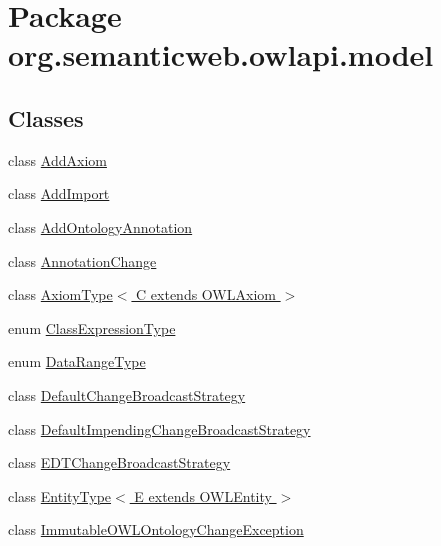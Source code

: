 \hypertarget{namespaceorg_1_1semanticweb_1_1owlapi_1_1model}{\section{Package org.\-semanticweb.\-owlapi.\-model}
\label{namespaceorg_1_1semanticweb_1_1owlapi_1_1model}
}
\subsection*{Classes}
\begin{DoxyCompactItemize}
\item 
class \hyperlink{classorg_1_1semanticweb_1_1owlapi_1_1model_1_1_add_axiom}{Add\-Axiom}
\item 
class \hyperlink{classorg_1_1semanticweb_1_1owlapi_1_1model_1_1_add_import}{Add\-Import}
\item 
class \hyperlink{classorg_1_1semanticweb_1_1owlapi_1_1model_1_1_add_ontology_annotation}{Add\-Ontology\-Annotation}
\item 
class \hyperlink{classorg_1_1semanticweb_1_1owlapi_1_1model_1_1_annotation_change}{Annotation\-Change}
\item 
class \hyperlink{classorg_1_1semanticweb_1_1owlapi_1_1model_1_1_axiom_type_3_01_c_01extends_01_o_w_l_axiom_01_4}{Axiom\-Type$<$ C extends O\-W\-L\-Axiom $>$}
\item 
enum \hyperlink{enumorg_1_1semanticweb_1_1owlapi_1_1model_1_1_class_expression_type}{Class\-Expression\-Type}
\item 
enum \hyperlink{enumorg_1_1semanticweb_1_1owlapi_1_1model_1_1_data_range_type}{Data\-Range\-Type}
\item 
class \hyperlink{classorg_1_1semanticweb_1_1owlapi_1_1model_1_1_default_change_broadcast_strategy}{Default\-Change\-Broadcast\-Strategy}
\item 
class \hyperlink{classorg_1_1semanticweb_1_1owlapi_1_1model_1_1_default_impending_change_broadcast_strategy}{Default\-Impending\-Change\-Broadcast\-Strategy}
\item 
class \hyperlink{classorg_1_1semanticweb_1_1owlapi_1_1model_1_1_e_d_t_change_broadcast_strategy}{E\-D\-T\-Change\-Broadcast\-Strategy}
\item 
class \hyperlink{classorg_1_1semanticweb_1_1owlapi_1_1model_1_1_entity_type_3_01_e_01extends_01_o_w_l_entity_01_4}{Entity\-Type$<$ E extends O\-W\-L\-Entity $>$}
\item 
class \hyperlink{classorg_1_1semanticweb_1_1owlapi_1_1model_1_1_immutable_o_w_l_ontology_change_exception}{Immutable\-O\-W\-L\-Ontology\-Change\-Exception}

\end{DoxyCompactItemize}
